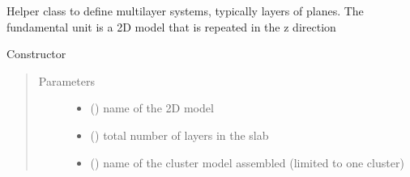 \documentclass[letterpaper,10pt,english]{sphinxmanual}
\begin{document}
\begin{fulllineitems}
\label{\detokenize{utilities:pyqcm.slab.slab}}
\sphinxAtStartPar
Helper class to define multi\sphinxhyphen{}layer systems, typically layers of planes.
The fundamental unit is a 2D model that is repeated in the z direction

\begin{fulllineitems}
\label{\detokenize{utilities:pyqcm.slab.slab.__init__}}
\sphinxAtStartPar
Constructor
\begin{quote}\begin{description}
\item[{Parameters}] \leavevmode\begin{itemize}
\item {} 
\sphinxAtStartPar
{} () \textendash{} name of the 2D model

\item {} 
\sphinxAtStartPar
{} () \textendash{} total number of layers in the slab

\item {} 
\sphinxAtStartPar
{} () \textendash{} name of the cluster model assembled (limited to one cluster)


\end{itemize}
\end{description}
\end{quote}
\end{fulllineitems}
\end{fulllineitems}
\end{document}

